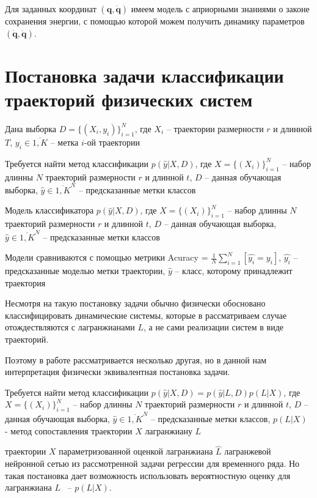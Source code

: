 \documentclass[a4paper, 12pt]{article}
\begin{document}
Для заданных координат $(\mathbf{q}, \mathbf{\dot{q}})$ имеем модель с априорными знаниями о законе сохранения энергии, с помощью которой можем получить динамику параметров $(\mathbf{\dot{q}}, \mathbf{\ddot{q}})$. 


\section{Постановка задачи классификации траекторий физических систем}\label{sec:classification}

Дана выборка
$D = \{(X_i, y_i)\}_{i=1}^N$, где $X_i$ -- траектории размерности $r$ и длинной $T$, $y_i \in \overline{1, K}$ -- метка $i$-ой траектории

Требуется найти метод классификации $p(\hat{y}|X, D)$, где $X = \{(X_i)\}_{i=1}^N$ -- набор длинны $N$ траекторий размерности $r$ и длинной $t$, $D$ -- данная обучающая выборка, $\hat{y} \in \overline{1, K}^N$ -- предсказанные метки классов

Модель классификатора $p(\hat{y}|X, D)$, где $X = \{(X_i)\}_{i=1}^N$ -- набор длинны $N$ траекторий размерности $r$ и длинной $t$, $D$ -- данная обучающая выборка, $\hat{y} \in \overline{1, K}^N$ -- предсказанные метки классов

Модели сравниваются с помощью метрики Acuracy = $\frac{1}{N} \sum_{i = 1}^N \left[\hat{y_i} = y_i\right]$, $\hat{y_i}$ -- предсказанные моделью метки траектории, $\hat{y}$ -- класс, которому принадлежит траектория

Несмотря на такую постановку задачи обычно физически обосновано классифицировать динамические системы, которые в рассматриваем случае отождествляются с лагранжианами $L$, а не сами реализации систем в виде траекторий. 

Поэтому в работе рассматривается несколько другая, но в данной нам интерпретация физически эквивалентная постановка задачи.

Требуется найти метод классификации $p(\hat{y}|X, D) = p(\hat{y}|L, D)p(L|X)$, где $X = \{(X_i)\}_{i=1}^N$ -- набор длинны $N$ траекторий размерности $r$ и длинной $t$, $D$ -- данная обучающая выборка, $\hat{y} \in \overline{1, K}^N$ -- предсказанные метки классов, $p(L|X)$ - метод сопоставления траектории $X$ лагранжиану $L$

 траектории $X$ параметризованной оценкой лагранжиана $\hat{L}$  лагранжевой нейронной сетью из рассмотренной задачи регрессии для временного ряда. Но такая постановка дает возможность использовать вероятностную оценку для лагранжиана $L$ ~-- $p(L|X)$.
\end{document}

